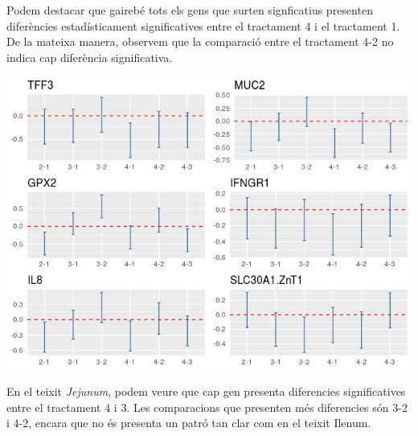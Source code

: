 \documentclass[english]{article}
\begin{document}
Podem destacar que gairebé tots els gens que surten signficatius presenten diferències estadísticament significatives entre el tractament 4 i el tractament 1. De la mateixa manera, observem que la comparació entre el tractament 4-2 no indica cap diferència significativa.
\begin{center}
\includegraphics[scale=0.45]{IleumTukey.png}
\end{center}
En el teixit \textit{Jejunum}, podem veure que cap gen presenta diferencies significatives entre el tractament 4 i 3. Les comparacions que presenten més diferencies són 3-2 i 4-2, encara que no és presenta un patró tan clar com en el teixit Ilenum.
\end{document}

